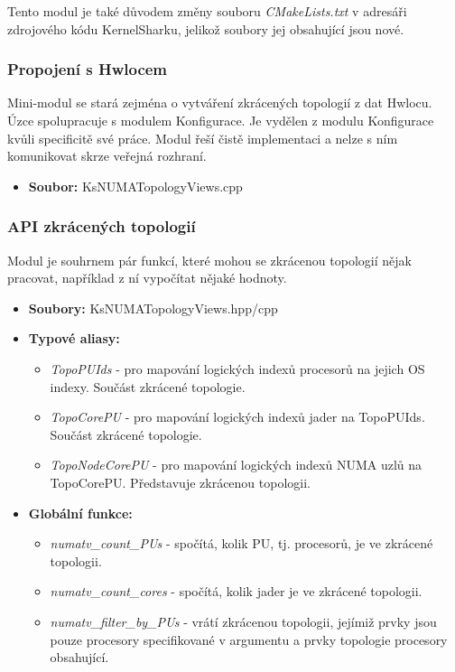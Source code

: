 Tento modul je také důvodem změny souboru \emph{CMakeLists.txt} v adresáři zdrojového kódu KernelSharku, jelikož soubory jej obsahující jsou nové.

\subsubsection*{Propojení s Hwlocem}
Mini-modul se stará zejména o vytváření zkrácených topologií z dat Hwlocu. Úzce spolupracuje s modulem Konfigurace. Je vydělen z modulu Konfigurace kvůli specificitě své práce. Modul řeší čistě implementaci a nelze s ním komunikovat skrze veřejná rozhraní.

\begin{itemize}
    \item \textbf{Soubor:} KsNUMATopologyViews.cpp
\end{itemize}

\subsubsection*{API zkrácených topologií}
Modul je souhrnem pár funkcí, které mohou se zkrácenou topologií nějak pracovat, například z ní vypočítat nějaké hodnoty.

\begin{itemize}
    \item \textbf{Soubory:} KsNUMATopologyViews.hpp/cpp
    \item \textbf{Typové aliasy:}
    \begin{itemize}
        \item \emph{TopoPUIds} - pro mapování logických indexů procesorů na jejich OS indexy. Součást zkrácené topologie.
        \item \emph{TopoCorePU} - pro mapování logických indexů jader na TopoPUIds. Součást zkrácené topologie.
        \item \emph{TopoNodeCorePU} - pro mapování logických indexů NUMA uzlů na TopoCorePU. Představuje zkrácenou topologii.
    \end{itemize}
    \item \textbf{Globální funkce:}
    \begin{itemize}
        \item \emph{numatv\_count\_PUs} - spočítá, kolik PU, tj. procesorů, je ve zkrácené topologii.
        \item \emph{numatv\_count\_cores} - spočítá, kolik jader je ve zkrácené topologii.
        \item \emph{numatv\_filter\_by\_PUs} - vrátí zkrácenou topologii, jejímiž prvky jsou pouze procesory specifikované v argumentu a prvky topologie procesory obsahující.
    \end{itemize}
\end{itemize}

